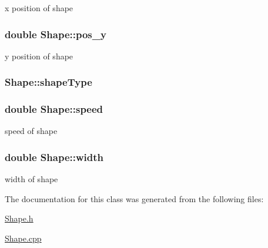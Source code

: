 x position of shape \hypertarget{classShape_aa7c6ae5806f6fba2a108e9e04fa98545}{
\subsubsection[{pos\-\_\-y}]{\setlength{\rightskip}{0pt plus 5cm}double Shape\-::pos\-\_\-y\hspace{0.3cm}{\ttfamily [private]}}}\label{classShape_aa7c6ae5806f6fba2a108e9e04fa98545}
y position of shape \hypertarget{classShape_a18af04fdf7a9e121518f3c7278693c60}{
\subsubsection[{shape\-Type}]{ Shape\-::shape\-Type\hspace{0.3cm}{\ttfamily [private]}}}\label{classShape_a18af04fdf7a9e121518f3c7278693c60}
\hypertarget{classShape_ad426ffc5fe63007bf8dedce3881725a6}{
\subsubsection[{speed}]{\setlength{\rightskip}{0pt plus 5cm}double Shape\-::speed\hspace{0.3cm}{\ttfamily [private]}}}\label{classShape_ad426ffc5fe63007bf8dedce3881725a6}
speed of shape \hypertarget{classShape_a018c8854f87fe06796659eb96bf588bc}{
\subsubsection[{width}]{\setlength{\rightskip}{0pt plus 5cm}double Shape\-::width\hspace{0.3cm}{\ttfamily [private]}}}\label{classShape_a018c8854f87fe06796659eb96bf588bc}
width of shape 

The documentation for this class was generated from the following files\-:\begin{DoxyCompactItemize}
\item 
\hyperlink{Shape_8h}{Shape.\-h}\item 
\hyperlink{Shape_8cpp}{Shape.\-cpp}\end{DoxyCompactItemize}
